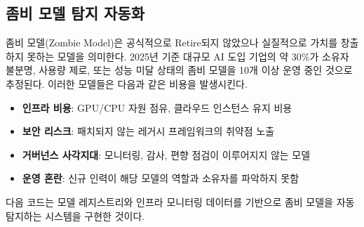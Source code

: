 \subsection{좀비 모델 탐지 자동화}
\label{sec:12.1.4}

좀비 모델(Zombie Model)은 공식적으로 Retire되지 않았으나 실질적으로 가치를 창출하지 못하는 모델을 의미한다. 2025년 기준 대규모 AI 도입 기업의 약 30\%가 소유자 불분명, 사용량 제로, 또는 성능 미달 상태의 좀비 모델을 10개 이상 운영 중인 것으로 추정된다\cite{sculley2015hidden}. 이러한 모델들은 다음과 같은 비용을 발생시킨다.

\begin{itemize}
 \item \textbf{인프라 비용}: GPU/CPU 자원 점유, 클라우드 인스턴스 유지 비용
 \item \textbf{보안 리스크}: 패치되지 않는 레거시 프레임워크의 취약점 노출
 \item \textbf{거버넌스 사각지대}: 모니터링, 감사, 편향 점검이 이루어지지 않는 모델
 \item \textbf{운영 혼란}: 신규 인력이 해당 모델의 역할과 소유자를 파악하지 못함
\end{itemize}

다음 코드는 모델 레지스트리와 인프라 모니터링 데이터를 기반으로 좀비 모델을 자동 탐지하는 시스템을 구현한 것이다.

